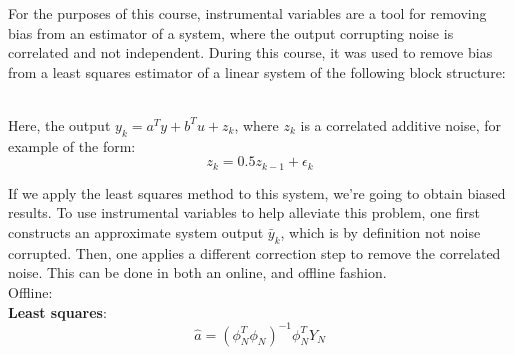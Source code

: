 {
For the purposes of this course, instrumental variables are a tool for removing bias from an estimator of a system, where the output corrupting noise is correlated and not independent. During this course, it was used to remove bias from a least squares estimator of a linear system of the following block structure:
\begin{center}
\end{center}

\\
Here, the output $y_k = a^{T}y + b^{T}u + z_k$, where $z_k$ is a correlated additive noise, for example of the form:
 \begin{equation}
     z_k = 0.5z_{k-1}+\epsilon_k
\end{equation}

If we apply the least squares method to this system, we're going to obtain biased results. To use instrumental variables to help alleviate this problem, one first constructs an approximate system output $\bar{y}_k$, which is by definition not noise corrupted. Then, one applies a different correction step to remove the correlated noise. This can be done in both an online, and offline fashion.\\
Offline:\\
\textbf{Least squares}:
 \begin{equation}
     \hat{a} = (\phi_N^{T}\phi_N)^{-1}\phi^{T}_N Y_N
\end{equation}

}
